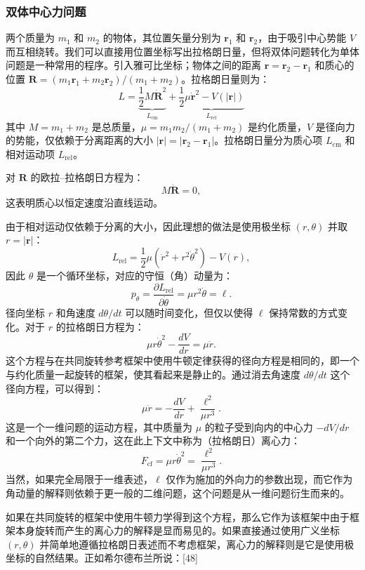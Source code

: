 \subsubsection{双体中心力问题}
两个质量为 \( m_1 \) 和 \( m_2 \) 的物体，其位置矢量分别为 \( \mathbf{r}_1 \) 和 \( \mathbf{r}_2 \)，由于吸引中心势能 \( V \) 而互相绕转。我们可以直接用位置坐标写出拉格朗日量，但将双体问题转化为单体问题是一种常用的程序。引入雅可比坐标；物体之间的距离 \( \mathbf{r} = \mathbf{r}_2 - \mathbf{r}_1 \) 和质心的位置 \( \mathbf{R} =(m_1 \mathbf{r}_1 + m_2 \mathbf{r}_2)/(m_1 + m_2) \)。拉格朗日量则为：
\[
L = \underbrace{\frac{1}{2} M \dot{\mathbf{R}}^2}_{L_{\text{cm}}} + \underbrace{\frac{1}{2} \mu \dot{\mathbf{r}}^2 - V(|\mathbf{r}|)}_{L_{\text{rel}}}~
\]
其中 \( M = m_1 + m_2 \) 是总质量，\( \mu = m_1 m_2/(m_1 + m_2) \) 是约化质量，\( V \) 是径向力的势能，仅依赖于分离距离的大小 \( |\mathbf{r}| = |\mathbf{r}_2 - \mathbf{r}_1| \)。拉格朗日量分为质心项 \( L_{\text{cm}} \) 和相对运动项 \( L_{\text{rel}} \)。

对 \( \mathbf{R} \) 的欧拉–拉格朗日方程为：
\[
M {\ddot {\mathbf{R}}} = 0,~
\]
这表明质心以恒定速度沿直线运动。

由于相对运动仅依赖于分离的大小，因此理想的做法是使用极坐标 \( (r, \theta) \) 并取 \( r = |\mathbf{r}| \)：
\[
L_{\text{rel}} = \frac{1}{2} \mu \left( {\dot{r}}^{2} + r^{2} {\dot{\theta}}^{2} \right) - V(r),~
\]
因此 \( \theta \) 是一个循环坐标，对应的守恒（角）动量为：
\[
p_{\theta} = \frac{\partial L_{\text{rel}}}{\partial {\dot{\theta}}} = \mu r^{2} {\dot{\theta}} = \ell.~
\]
径向坐标 \( r \) 和角速度 \( d\theta/dt \) 可以随时间变化，但仅以使得 \( \ell \) 保持常数的方式变化。对于 \( r \) 的拉格朗日方程为：
\[
\mu r {\dot{\theta}}^{2} - \frac{dV}{dr} = \mu {\ddot{r}}.~
\]
这个方程与在共同旋转参考框架中使用牛顿定律获得的径向方程是相同的，即一个与约化质量一起旋转的框架，使其看起来是静止的。通过消去角速度 \( d\theta/dt \) 这个径向方程，可以得到：
\[
\mu {\ddot {r}} = -\frac{dV}{dr} + \frac{\ell^2}{\mu r^3}.~
\]
这是一个一维问题的运动方程，其中质量为 \( \mu \) 的粒子受到向内的中心力 \( -dV/dr\) 和一个向外的第二个力，这在此上下文中称为（拉格朗日）离心力：
\[
F_{\mathrm{cf}} = \mu r \dot{\theta}^2 = \frac{\ell^2}{\mu r^3}.~
\]
当然，如果完全局限于一维表述，\( \ell \) 仅作为施加的外向力的参数出现，而它作为角动量的解释则依赖于更一般的二维问题，这个问题是从一维问题衍生而来的。

如果在共同旋转的框架中使用牛顿力学得到这个方程，那么它作为该框架中由于框架本身旋转而产生的离心力的解释是显而易见的。如果直接通过使用广义坐标 \( (r, \theta) \) 并简单地遵循拉格朗日表述而不考虑框架，离心力的解释则是它是使用极坐标的自然结果。正如希尔德布兰所说：[48]

